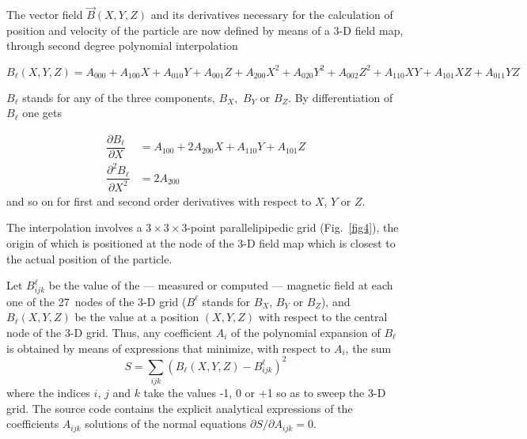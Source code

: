 The vector field $ \vec  B(X,Y,Z) $ and its derivatives necessary
for the calculation of position and velocity of the particle are now defined by means 
of a 3-D field map, through second degree  polynomial interpolation

\begin{equation}
\!\!	B_{\ell} (X,Y,Z) = A_{000} + A_{100} X + A_{010} Y + A_{001} Z + 
	A_{200} X^2 + A_{020} Y^2  
	+     A_{002} Z^2 + A_{110} X Y + A_{101} X Z + A_{011} Y Z
	\label{eq2-4-12}
\end{equation}

\noindent$ B_{\ell} $ stands for any of the three components, $ B_X, $ $ B_Y $
or $ B_Z $.  By 
differentiation of $ B_{\ell} $ one gets 

\begin{equation}
	\begin{aligned}
		 \dfrac{ \partial B_{\ell} }{ \partial X} 
		    & =  A_{100} + 2 A_{200} X + A_{110} Y + A_{101} Z\\
		\dfrac{\partial^2 B_{\ell}}{ \partial X^2} 
		    & =  2 A_{200} 
	\end{aligned}
	\label{eq2-4-13}
\end{equation}
%
 and so on for first and second order derivatives with respect to 
 $X$, $ Y $ or $ Z $. 
 
\noindent The interpolation involves a $ 3  \times   3  \times   3$-point 
parallelipipedic grid (Fig.~\ref{fig4}),   
the origin of which is positioned at the node of the 3-D field map which is 
closest to the actual position of the particle. 
\medskip

\noindent Let $ B^{\ell}_{ijk} $ be the value of the --- measured or computed ---
magnetic field at each one of the 27~nodes of the 3-D grid ($ B^{\ell} $ stands for  
$ B_X$, $ B_Y $ or $ B_Z $), and $ B_{\ell} (X,Y,Z) $ be the value at a
position $ (X,Y,Z) $ 
with respect to the central node of the 3-D grid. Thus, any 
coefficient $ A_i $ of the polynomial expansion of $ B_{\ell} $ is obtained by
means of expressions that minimize, with respect to $ A_i $, the sum
%
\begin{equation}
	S = \sum_{ijk} \left(B_{\ell} (X,Y,Z)-B^{\ell}_{ijk} \right)^2 
	\label{eq2-4-14} %
\end{equation}
%
 where the indices $ i$, $j $ and $ k $ take the values -1, 0 or +1 so as
to sweep the 3-D grid. The source code contains the explicit analytical 
expressions of the coefficients $A_{ijk}$ solutions of the normal 
equations $\partial S / \partial A_{ijk} = 0$.


